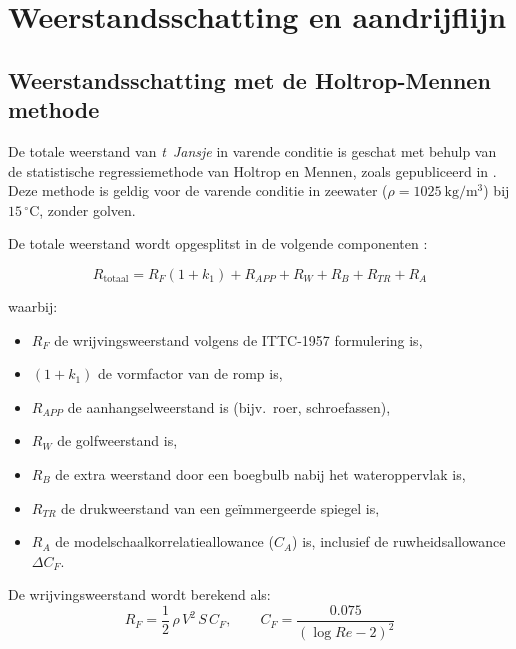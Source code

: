 
 
\chapter{Weerstandsschatting en aandrijflijn}
\label{ch:holtrop-aandrijflijn}
 
\section{Weerstandsschatting met de Holtrop-Mennen methode}
\label{sec:holtrop}
 
De totale weerstand van \emph{t~Jansje} in varende conditie is geschat met behulp van de
statistische regressiemethode van Holtrop en Mennen, zoals gepubliceerd in
\cite{Holtrop1984}. Deze methode is geldig voor de varende conditie in zeewater
($\rho = 1025\ \mathrm{kg/m^3}$) bij $15\,^{\circ}\mathrm{C}$, zonder golven.
 
De totale weerstand wordt opgesplitst in de volgende componenten \cite{Holtrop1984}:
 
\begin{equation}
    R_\mathrm{totaal} = R_F(1+k_1) + R_{APP} + R_W + R_B + R_{TR} + R_A
    \label{eq:Rtot}
\end{equation}
 
\noindent waarbij:
\begin{itemize}
    \item $R_F$ de wrijvingsweerstand volgens de ITTC-1957 formulering is,
    \item $(1+k_1)$ de vormfactor van de romp is,
    \item $R_{APP}$ de aanhangselweerstand is (bijv.\ roer, schroefassen),
    \item $R_W$ de golfweerstand is,
    \item $R_B$ de extra weerstand door een boegbulb nabij het wateroppervlak is,
    \item $R_{TR}$ de drukweerstand van een geïmmergeerde spiegel is,
    \item $R_A$ de modelschaalkorrelatieallowance ($C_A$) is, inclusief de
          ruwheidsallowance $\Delta C_F$.
\end{itemize}
 
De wrijvingsweerstand wordt berekend als:
\begin{equation}
    R_F = \frac{1}{2}\,\rho\,V^2\,S\,C_F, \qquad
    C_F = \frac{0.075}{(\log Re - 2)^2}
    \label{eq:RF}
\end{equation}
 
